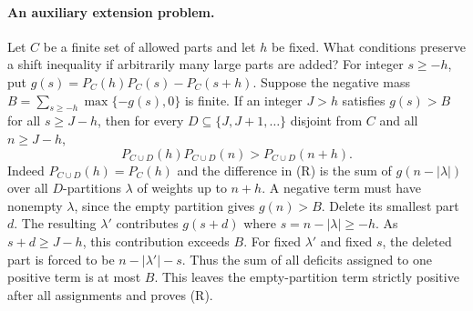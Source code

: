 \documentclass[11pt,a4paper]{article}
\numberwithin{equation}{section}
\begin{document}
\paragraph{An auxiliary extension problem.}
Let $C$ be a finite set of allowed parts and let $h$ be fixed.
What conditions preserve a shift inequality if arbitrarily many large
parts are added? For integer $s\ge-h$, put
$g(s)=P_C(h)P_C(s)-P_C(s+h)$. Suppose the negative mass
$B=\sum_{s\ge-h}\max\{-g(s),0\}$ is finite. If an integer $J>h$ satisfies
$g(s)>B$ for all $s\ge J-h$, then for every
$D\subseteq\{J,J+1,\ldots\}$ disjoint from $C$ and all $n\ge J-h$,
\[
 P_{C\cup D}(h)P_{C\cup D}(n)>P_{C\cup D}(n+h).
\tag{R}
\]
Indeed $P_{C\cup D}(h)=P_C(h)$ and the difference in (R) is the sum
of $g(n-|\lambda|)$ over all $D$-partitions $\lambda$ of weights up
to $n+h$. A negative term must have nonempty $\lambda$, since the
empty partition gives $g(n)>B$. Delete its smallest part $d$. The
resulting $\lambda'$ contributes $g(s+d)$ where $s=n-|\lambda|\ge-h$.
As $s+d\ge J-h$, this contribution exceeds $B$. For fixed $\lambda'$
and fixed $s$, the deleted part is forced to be $n-|\lambda'|-s$.
Thus the sum of all deficits assigned to one positive term is at most
$B$. This leaves the empty-partition term strictly positive after all
assignments and proves (R).
\end{document}
